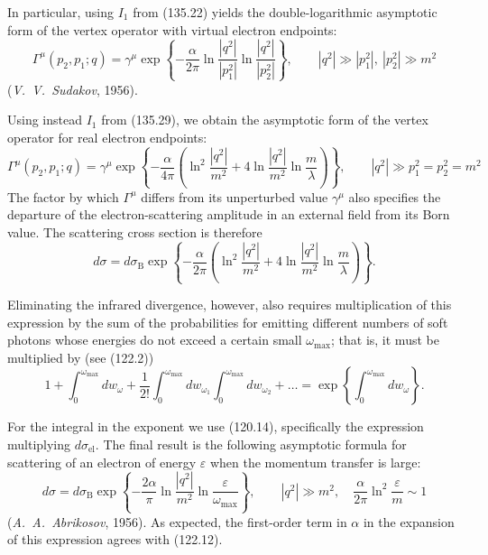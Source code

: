 In particular, using $I_1$ from (135.22) yields the double-logarithmic asymptotic form of the vertex operator with virtual electron endpoints:
\begin{equation}
\Gamma^\mu(p_2,p_1;q)=\gamma^\mu\exp\left\{-\frac{\alpha}{2\pi}
\ln\frac{|q^2|}{|p_1^2|}\ln\frac{|q^2|}{|p_2^2|}\right\},
\qquad |q^2|\gg|p_1^2|,\ |p_2^2|\gg m^2
\tag{136.7}
\end{equation}
(\emph{V.~V.~Sudakov}, 1956).

Using instead $I_1$ from (135.29), we obtain the asymptotic form of the vertex operator for real electron endpoints:
\begin{equation}
\Gamma^\mu(p_2,p_1;q)=\gamma^\mu\exp\left\{-\frac{\alpha}{4\pi}
\left(\ln^2\frac{|q^2|}{m^2}+4\ln\frac{|q^2|}{m^2}\ln\frac{m}{\lambda}\right)\right\},
\qquad |q^2|\gg p_1^2=p_2^2=m^2
\tag{136.8}
\end{equation}
The factor by which $\Gamma^\mu$ differs from its unperturbed value $\gamma^\mu$ also specifies the departure of the electron-scattering amplitude in an external field from its Born value. The scattering cross section is therefore
\begin{equation}
d\sigma=d\sigma_{\text{B}}\exp\left\{-\frac{\alpha}{2\pi}
\left(\ln^2\frac{|q^2|}{m^2}+4\ln\frac{|q^2|}{m^2}\ln\frac{m}{\lambda}\right)\right\}.
\tag{136.9}
\end{equation}

Eliminating the infrared divergence, however, also requires multiplication of this expression by the sum of the probabilities for emitting different numbers of soft photons whose energies do not exceed a certain small $\omega_{\max}$; that is, it must be multiplied by (see (122.2))
\begin{equation}
1+\int_0^{\omega_{\max}}dw_\omega
+\frac{1}{2!}\int_0^{\omega_{\max}}dw_{\omega_1}
\int_0^{\omega_{\max}}dw_{\omega_2}+\ldots
=\exp\left\{\int_0^{\omega_{\max}}dw_\omega\right\}.
\tag{136.10}
\end{equation}

For the integral in the exponent we use (120.14), specifically the expression multiplying $d\sigma_{\text{el}}$. The final result is the following asymptotic formula for scattering of an electron of energy $\varepsilon$ when the momentum transfer is large:
\begin{equation}
d\sigma=d\sigma_{\text{B}}\exp\left\{-\frac{2\alpha}{\pi}
\ln\frac{|q^2|}{m^2}\ln\frac{\varepsilon}{\omega_{\max}}\right\},
\qquad |q^2|\gg m^2,\quad
\frac{\alpha}{2\pi}\ln^2\frac{\varepsilon}{m}\sim1
\tag{136.11}
\end{equation}
(\emph{A.~A.~Abrikosov}, 1956). As expected, the first-order term in $\alpha$ in the expansion of this expression agrees with (122.12).

